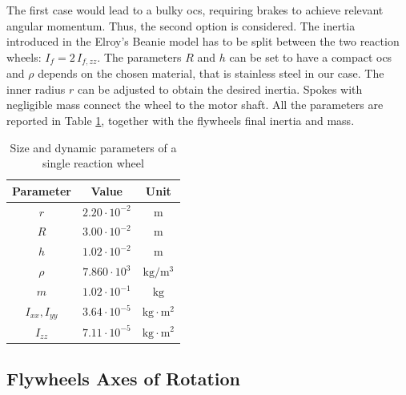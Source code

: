 \documentclass[letterpaper, 10 pt, conference]{ieeeconf}  %
\begin{document}
The first case would lead to a bulky \gls{ocs}, requiring brakes to achieve relevant angular momentum. Thus, the second option is considered. The inertia introduced in the Elroy's Beanie model has to be split between the two reaction wheels: $I_f = 2 \, I_{f, zz}$. 
The parameters $R$ and $h$ can be set to have a compact \gls{ocs} and $\rho$ depends on the chosen material, that is stainless steel in our case. The inner radius $r$ can be adjusted to obtain the desired inertia. Spokes with negligible mass connect the wheel to the motor shaft. All the parameters are reported in Table \ref{tab:dim_fw}, together with the flywheels final inertia and mass.
\begin{table}
	\centering
	\caption{\small Size and dynamic parameters of a single reaction wheel}
	\begin{tabular}{ccc}
		Parameter & Value & Unit \\
		\hline
		\hline
		$r$ & $2.20\cdot 10^{-2}$ & $\mathrm{m}$ \\
		$R$ & $3.00\cdot 10^{-2}$ & $\mathrm{m}$ \\
		$h$   & $1.02\cdot 10^{-2}$ & $\mathrm{m}$ \\
		$\rho$   & $7.860 \cdot 10^{3}$ & $\mathrm{kg/m^3}$ \\
		$m$   & $1.02\cdot 10^{-1}$ & $\mathrm{kg}$ \\
		$I_{xx}, I_{yy}$   & $3.64 \cdot 10^{-5}$ & $\mathrm{kg \cdot m^2}$ \\
	$I_{zz}$   & $7.11 \cdot 10^{-5}$ & $ \mathrm{kg \cdot m^2}$ \\
	\end{tabular}
	\label{tab:dim_fw}
\end{table}

\subsection{Flywheels Axes of Rotation}
\end{document}
